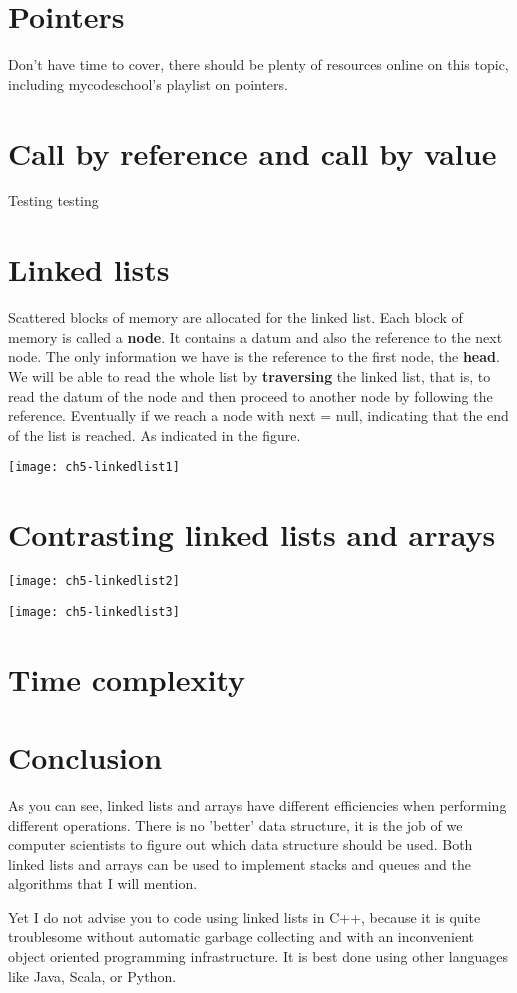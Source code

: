 \section{Pointers}

Don't have time to cover, there should be plenty of resources online on this topic, including mycodeschool's playlist on pointers.

\section{Call by reference and call by value}

Testing testing

\section{Linked lists}

Scattered blocks of memory are allocated for the linked list. Each block of memory is called a \textbf{node}. It contains a datum and also the reference to the next node. The only information we have is the reference to the first node, the \textbf{head}. We will be able to read the whole list by \textbf{traversing} the linked list, that is, to read the datum of the node and then proceed to another node by following the reference. Eventually if we reach a node with next = null, indicating that the end of the list is reached. As indicated in the figure.

\texttt{[image: ch5-linkedlist1]}

\section{Contrasting linked lists and arrays}

\texttt{[image: ch5-linkedlist2]}

\texttt{[image: ch5-linkedlist3]}

\section{Time complexity}



\section{Conclusion}
As you can see, linked lists and arrays have different efficiencies when performing different operations. There is no 'better' data structure, it is the job of we computer scientists to figure out which data structure should be used. Both linked lists and arrays can be used to implement stacks and queues and the algorithms that I will mention. 

Yet I do not advise you to code using linked lists in C++, because it is quite troublesome without automatic garbage collecting and with an inconvenient object oriented programming infrastructure. It is best done using other languages like Java, Scala, or Python.

